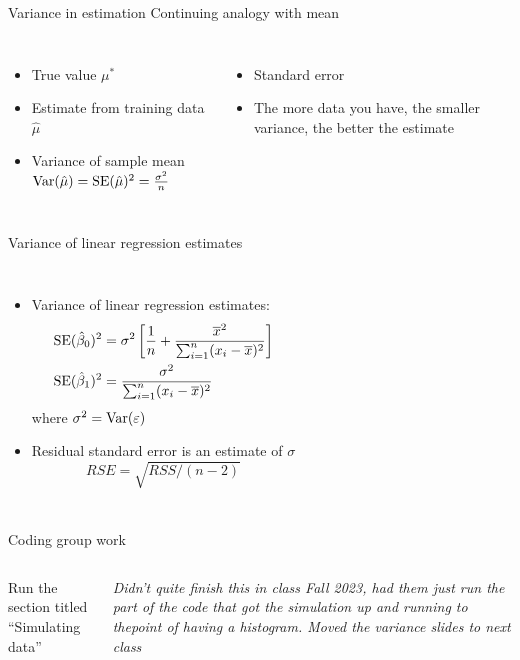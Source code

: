 \documentclass[aspectratio=169,usenames,dvipsnames]{beamer}
\newcommand{\InstructorNotes}[1]{\textit{\color{orange}#1}}
\newcommand{\InstructorList}[1]{
\begin{itemize}
	\color{orange}
	#1
\end{itemize}
}
\begin{document}
\begin{frame}[t]{Variance in estimation}
	{Continuing analogy with mean}

\begin{columns}
\centering

\begin{itemize}
	\item True value $\mu^*$
	\item Estimate from training data $\hat \mu$
	\item Variance of sample mean $\mathrm{Var}(\hat \mu) = \mathrm{SE}(\hat \mu)^2 = \frac{\sigma^2}{n}$
\end{itemize}
\InstructorList{
  \item Standard error 
  \item The more data you have, the smaller variance, the better the estimate 
}
\end{columns}

\end{frame}
\begin{frame}[t]{Variance of linear regression estimates }
\begin{columns}
\centering
\centering
\begin{itemize}
	\item Variance of linear regression estimates:
	\begin{align*}
		\mathrm{SE}(\hat \beta_0)^2
				&= \sigma^2 \left[ \frac{1}{n} + \frac{\overline x^2}{\sum_{i=1}^n (x_i - \overline x)^2}\right]\\
		\mathrm{SE}(\hat \beta_1)^2 &= \frac{\sigma^2}{\sum_{i=1}^n (x_i - \overline x)^2}
	\end{align*}
	where $\sigma^2 = \mathrm{Var}(\varepsilon)$
	\item Residual standard error is an estimate of $\sigma$
	\begin{equation*}
		RSE = \sqrt{RSS/ (n-2)}
	\end{equation*}
\end{itemize}
\centering


\end{columns}
\end{frame}
{
\begin{frame}[t]{Coding group work}
\begin{columns}
\centering
Run the section titled ``Simulating data''

\centering
\InstructorNotes{Didn't quite finish this in class Fall 2023, had them just run the part of the code that got the simulation up and running to thepoint of having a histogram. Moved the variance slides to next class}
\end{columns}
\end{frame}
}
\end{document}
